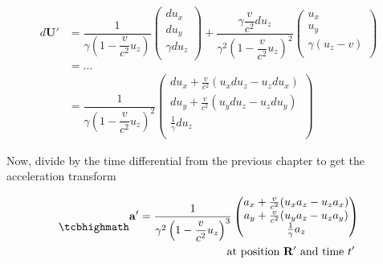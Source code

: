 \begin{equation}
	\begin{aligned}
		d\mathbf{U}' & = \dfrac{1}{\gamma\left(1- \dfrac{v}{c^2} u_z\right) }
		\begin{pmatrix}
			du_x        \\
			du_y        \\
			\gamma du_z \\
		\end{pmatrix}
		+ \dfrac{\gamma \dfrac{v}{c^2} du_z}{\gamma^2\left(1- \dfrac{v}{c^2} u_z\right)^2 }
		\begin{pmatrix}
			u_x                             \\
			u_y                             \\
			\gamma \left( u_z  - v  \right) \\
		\end{pmatrix}                                          \\
		             & = ...                                                     \\
		             & =  \dfrac{1}{\gamma\left(1- \dfrac{v}{c^2} u_z\right)^2 }
		\begin{pmatrix}
			du_x + \frac{v}{c^2}( u_x du_z - u_z du_x) \\
			du_y + \frac{v}{c^2}( u_y du_z - u_z du_y) \\
			\frac{1}{\gamma} du_z                      \\
		\end{pmatrix}
	\end{aligned}
\end{equation}

Now, divide by the time differential from the previous chapter to get the acceleration transform

\begin{equation}
	\mhl{
		\begin{aligned}
			\mathbf{a}' =  \dfrac{1}{\gamma^2\left(1- \dfrac{v}{c^2} u_z\right)^3 }
			\begin{pmatrix}
				a_x + \frac{v}{c^2}(u_x a_z - u_z a_x) \\
				a_y + \frac{v}{c^2}(u_y a_z - u_z a_y) \\
				\frac{1}{\gamma} a_z                   \\
			\end{pmatrix}
			\\
			\text{at position $\mathbf{R}'$ and time $t'$ }
		\end{aligned}
	}
\end{equation}

